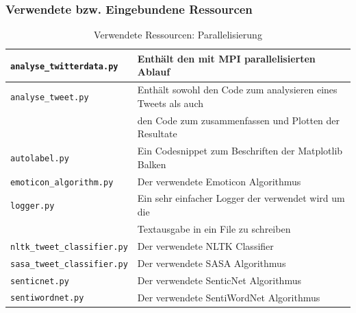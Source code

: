 \subsubsection{Verwendete bzw. Eingebundene Ressourcen}
\begin{table}[H]
\begin{center}
\begin{tabular}{|l|l|}
	\hline
	\lstinline$analyse_twitterdata.py$ & Enthält den mit MPI parallelisierten Ablauf\\ \hline
	\lstinline$analyse_tweet.py$ & Enthält sowohl den Code zum analysieren eines Tweets als auch\\
	& den Code zum zusammenfassen und Plotten der Resultate\\ \hline
	\lstinline$autolabel.py$ & Ein Codesnippet zum Beschriften der Matplotlib Balken\\ \hline
	\lstinline$emoticon_algorithm.py$ & Der verwendete Emoticon Algorithmus\\ \hline
	\lstinline$logger.py$ & Ein sehr einfacher Logger der verwendet wird um die \\
	& Textausgabe in ein File zu schreiben\\ \hline
	\lstinline$nltk_tweet_classifier.py$ & Der verwendete NLTK Classifier\\ \hline
	\lstinline$sasa_tweet_classifier.py$ & Der verwendete SASA Algorithmus\\ \hline
	\lstinline$senticnet.py$ & Der verwendete SenticNet Algorithmus\\ \hline
	\lstinline$sentiwordnet.py$ & Der verwendete SentiWordNet Algorithmus\\ \hline
\end{tabular}
\caption{Verwendete Ressourcen: Parallelisierung}
\end{center}
\end{table}